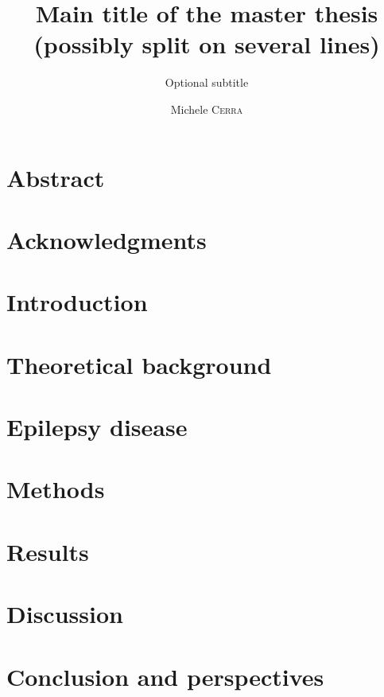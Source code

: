 \documentclass{EPL-master-thesis-covers-EN}
\title{Main title of the master thesis (possibly split on several lines)}
\subtitle{Optional subtitle}
\author{Michele \textsc{Cerra}}
\begin{document}
  \maketitle

  \chapter*{Abstract}
  
  \chapter*{Acknowledgments}

  \tableofcontents

  \chapter*{Introduction}

  \chapter{Theoretical background}
  

  \chapter[Epilepsy]{Epilepsy disease}
  
  
  \chapter{Methods}
  

  \chapter{Results}

  \chapter{Discussion}

  \chapter*{Conclusion and perspectives}
  
  
  

  \backcoverpage
\end{document}
